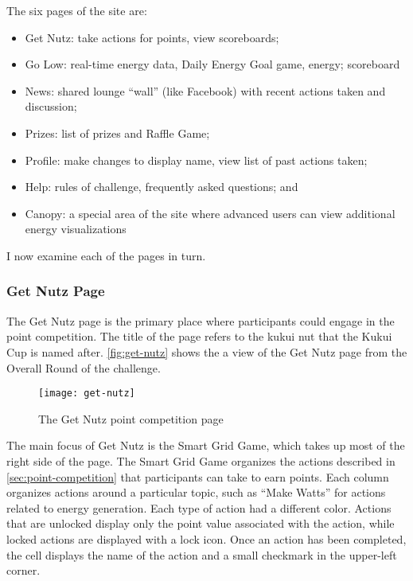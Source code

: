 The six pages of the site are:
\begin{itemize}
	\item Get Nutz: take actions for points, view scoreboards;
	\item Go Low: real-time energy data, Daily Energy Goal game, energy; scoreboard
	\item News: shared lounge ``wall'' (like Facebook) with recent actions taken and discussion;
	\item Prizes: list of prizes and Raffle Game;
	\item Profile: make changes to display name, view list of past actions taken;
	\item Help: rules of challenge, frequently asked questions; and
	\item Canopy: a special area of the site where advanced users can view additional energy visualizations
\end{itemize}

I now examine each of the pages in turn.


\subsubsection{Get Nutz Page}
\label{sec:get-nutz-page}

The Get Nutz page is the primary place where participants could engage in the point competition. The title of the page refers to the kukui nut that the Kukui Cup is named after. \autoref{fig:get-nutz} shows the a view of the Get Nutz page from the Overall Round of the challenge.

\begin{figure}[htbp]
	\centering
		\texttt{[image: get-nutz]}
		\caption{The Get Nutz point competition page}
\label{fig:get-nutz}
\end{figure}

The main focus of Get Nutz is the Smart Grid Game, which takes up most of the right side of the page. The Smart Grid Game organizes the actions described in \autoref{sec:point-competition} that participants can take to earn points. Each column organizes actions around a particular topic, such as ``Make Watts'' for actions related to energy generation. Each type of action had a different color. Actions that are unlocked display only the point value associated with the action, while locked actions are displayed with a lock icon. Once an action has been completed, the cell displays the name of the action and a small checkmark in the upper-left corner.

